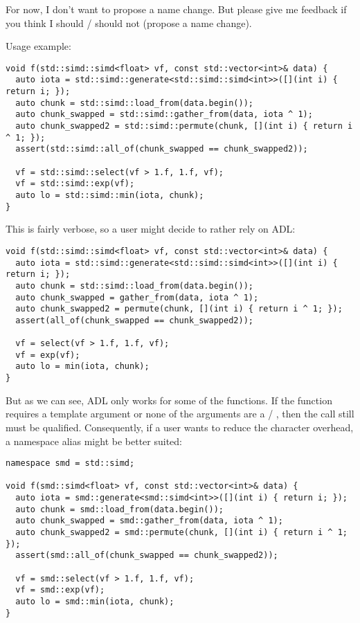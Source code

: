 For now, I don't want to propose a name change.
But please give me feedback if you think I should / should not (propose a name
change).

Usage example:
\medskip\begin{lstlisting}[style=Vc]
void f(std::simd::simd<float> vf, const std::vector<int>& data) {
  auto iota = std::simd::generate<std::simd::simd<int>>([](int i) { return i; });
  auto chunk = std::simd::load_from(data.begin());
  auto chunk_swapped = std::simd::gather_from(data, iota ^ 1);
  auto chunk_swapped2 = std::simd::permute(chunk, [](int i) { return i ^ 1; });
  assert(std::simd::all_of(chunk_swapped == chunk_swapped2));

  vf = std::simd::select(vf > 1.f, 1.f, vf);
  vf = std::simd::exp(vf);
  auto lo = std::simd::min(iota, chunk);
}
\end{lstlisting}

This is fairly verbose, so a user might decide to rather rely on ADL:
\medskip\begin{lstlisting}[style=Vc]
void f(std::simd::simd<float> vf, const std::vector<int>& data) {
  auto iota = std::simd::generate<std::simd::simd<int>>([](int i) { return i; });
  auto chunk = std::simd::load_from(data.begin());
  auto chunk_swapped = gather_from(data, iota ^ 1);
  auto chunk_swapped2 = permute(chunk, [](int i) { return i ^ 1; });
  assert(all_of(chunk_swapped == chunk_swapped2));

  vf = select(vf > 1.f, 1.f, vf);
  vf = exp(vf);
  auto lo = min(iota, chunk);
}
\end{lstlisting}

But as we can see, ADL only works for some of the functions.
If the function requires a template argument or none of the arguments are a
\simd / \mask, then the call still must be qualified.
Consequently, if a user wants to reduce the character overhead, a namespace
alias might be better suited:
\medskip\begin{lstlisting}[style=Vc]
namespace smd = std::simd;

void f(smd::simd<float> vf, const std::vector<int>& data) {
  auto iota = smd::generate<smd::simd<int>>([](int i) { return i; });
  auto chunk = smd::load_from(data.begin());
  auto chunk_swapped = smd::gather_from(data, iota ^ 1);
  auto chunk_swapped2 = smd::permute(chunk, [](int i) { return i ^ 1; });
  assert(smd::all_of(chunk_swapped == chunk_swapped2));

  vf = smd::select(vf > 1.f, 1.f, vf);
  vf = smd::exp(vf);
  auto lo = smd::min(iota, chunk);
}
\end{lstlisting}

